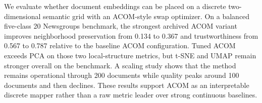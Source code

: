 We evaluate whether document embeddings can be placed on a discrete two-dimensional semantic grid with an ACOM-style swap optimizer. On a balanced five-class 20 Newsgroups benchmark, the strongest archived ACOM variant improves neighborhood preservation from 0.134 to 0.367 and trustworthiness from 0.567 to 0.787 relative to the baseline ACOM configuration. Tuned ACOM exceeds PCA on those two local-structure metrics, but t-SNE and UMAP remain stronger overall on the benchmark. A scaling study shows that the method remains operational through 200 documents while quality peaks around 100 documents and then declines. These results support ACOM as an interpretable discrete mapper rather than a raw metric leader over strong continuous baselines.
